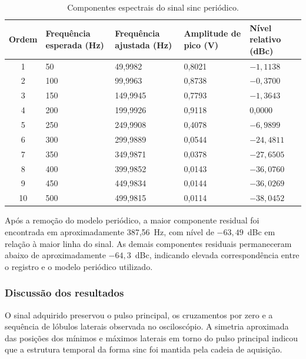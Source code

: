 \documentclass[a4paper,12pt]{fcte}
\begin{document}
\begin{table}[!htbp]
    \centering
    \caption{Componentes espectrais do sinal sinc periódico.}
    \label{tab:componentes_sinc}
    \small
    \begin{tabularx}{\textwidth}{c X X p{2.2cm} p{3.9cm}}
        \hline
        \textbf{Ordem} &
        \textbf{Frequência \mbox{esperada} (Hz)} &
        \textbf{Frequência \mbox{ajustada} (Hz)} &
        \textbf{Amplitude de pico (V)} &
        \textbf{Nível relativo (dBc)} \\
        \hline
        1  & 50  & 49,9982  & 0,8021 & $-1,1138$ \\
        2  & 100 & 99,9963  & 0,8738 & $-0,3700$ \\
        3  & 150 & 149,9945 & 0,7793 & $-1,3643$ \\
        4  & 200 & 199,9926 & 0,9118 & 0,0000 \\
        5  & 250 & 249,9908 & 0,4078 & $-6,9899$ \\
        6  & 300 & 299,9889 & 0,0544 & $-24,4811$ \\
        7  & 350 & 349,9871 & 0,0378 & $-27,6505$ \\
        8  & 400 & 399,9852 & 0,0143 & $-36,0760$ \\
        9  & 450 & 449,9834 & 0,0144 & $-36,0269$ \\
        10 & 500 & 499,9815 & 0,0114 & $-38,0452$ \\
        \hline
    \end{tabularx}
\end{table}

Após a remoção do modelo periódico, a maior componente residual foi encontrada em aproximadamente 387,56~Hz, com nível de $-63,49$~dBc em relação à maior linha do sinal. As demais componentes residuais permaneceram abaixo de aproximadamente $-64,3$~dBc, indicando elevada correspondência entre o registro e o modelo periódico utilizado.

\subsubsection{Discussão dos resultados}
\label{subsubsec:discussao_sinc}

O sinal adquirido preservou o pulso principal, os cruzamentos por zero e a sequência de lóbulos laterais observada no osciloscópio. A simetria aproximada das posições dos mínimos e máximos laterais em torno do pulso principal indicou que a estrutura temporal da forma sinc foi mantida pela cadeia de aquisição.
\end{document}
